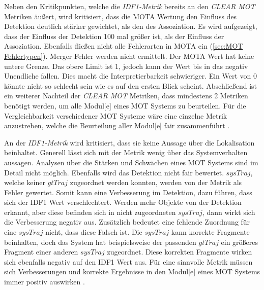 Neben den Kritikpunkten, welche die \textit{\gls{IDF1}-Metrik} bereits an den \textit{\acrshort{CLEAR} \gls{MOT}} Metriken äußert, wird kritisiert, dass die \gls{MOTA} Wertung den Einfluss des \gls{Detektion} deutlich stärker gewichtet, als den des \gls{Assoziation}. Es wird aufgezeigt, dass der Einfluss der \gls{Detektion} 100 mal größer ist, als der Einfluss der \gls{Assoziation}. Ebenfalls fließen nicht alle Fehlerarten in \gls{MOTA} ein (\ref{sec:MOT Fehlertypen}). Merger Fehler werden nicht ermittelt. Der \gls{MOTA} Wert hat keine untere Grenze. Das obere Limit ist 1, jedoch kann der Wert bis in das negativ Unendliche fallen. Dies macht die Interpretierbarkeit schwieriger. Ein Wert von 0 könnte nicht so schlecht sein wie es auf den ersten Blick scheint. Abschließend ist ein weiterer Nachteil der \textit{\acrshort{CLEAR} \gls{MOT}} Metriken, dass mindestens 2 Metriken benötigt werden, um  alle \gls{Modul}[e] eines \gls{MOT} Systems zu beurteilen. Für die Vergleichbarkeit verschiedener \gls{MOT} Systeme wäre eine einzelne Metrik anzustreben, welche die Beurteilung aller \gls{Modul}[e] fair zusammenführt \cite{HOTA}.\par

An der \textit{\gls{IDF1}-Metrik} wird kritisiert, dass sie keine Aussage über die \gls{Lokalisation} beinhaltet. Generell lässt sich mit der Metrik wenig über das Systemverhalten aussagen. Analysen über die Stärken und Schwächen eines \gls{MOT} Systems sind im Detail nicht möglich. Ebenfalls wird das \gls{Detektion} nicht fair bewertet. \(sysTraj\), welche keiner \(gtTraj\) zugeordnet werden konnten, werden von der Metrik als Fehler gewertet. Somit kann eine Verbesserung im \gls{Detektion}, dazu führen, dass sich der \gls{IDF1} Wert verschlechtert. Werden mehr Objekte von der \gls{Detektion} erkannt, aber diese befinden sich in nicht zugeordneten \(sysTraj\), dann wirkt sich die Verbesserung negativ aus. Zusätzlich bedeutet eine fehlende Zuordnung für eine \(sysTraj\) nicht, dass diese Falsch ist. Die \(sysTraj\) kann korrekte Fragmente beinhalten, doch das System hat beispielsweise der passenden \(gtTraj\) ein größeres Fragment einer anderen \(sysTraj\) zugeordnet. Diese korrekten Fragmente wirken sich ebenfalls negativ auf den \gls{IDF1} Wert aus. Für eine sinnvolle Metrik müssen sich Verbesserungen und korrekte Ergebnisse in den \gls{Modul}[e] eines \gls{MOT} Systems immer positiv auswirken \cite{HOTA}. \par


